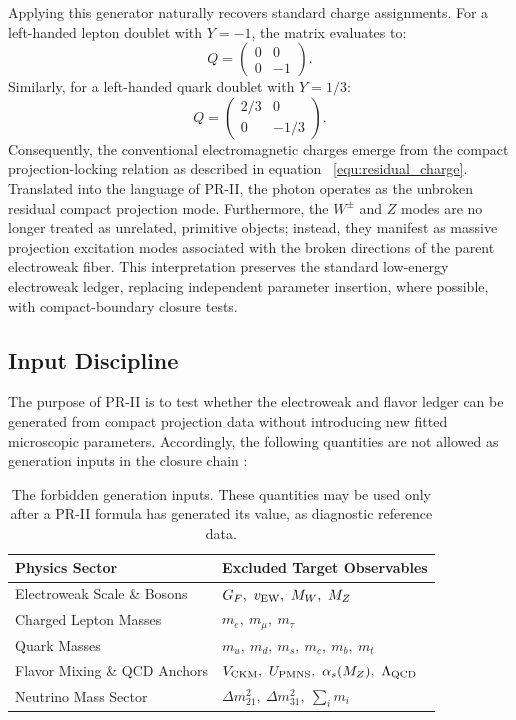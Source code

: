 \documentclass[11pt]{article}
\renewcommand{\arraystretch}{1.22}
\renewcommand{\arraystretch}{1.4}
\begin{document}
Applying this generator naturally recovers standard charge assignments. For a left-handed lepton doublet with \(Y=-1\), the matrix evaluates to:
\begin{equation}
Q
=
\begin{pmatrix}
0 & 0\\
0 & -1
\end{pmatrix}.
\end{equation}
Similarly, for a left-handed quark doublet with \(Y=1/3\):
\begin{equation}
Q
=
\begin{pmatrix}
2/3 & 0\\
0 & -1/3
\end{pmatrix}.
\end{equation}
Consequently, the conventional electromagnetic charges emerge from the compact projection-locking relation as described in equation ~\ref{equ:residual_charge}. Translated into the language of PR-II, the photon operates as the unbroken residual compact projection mode. Furthermore, the \(W^\pm\) and \(Z\) modes are no longer treated as unrelated, primitive objects; instead, they manifest as massive projection excitation modes associated with the broken directions of the parent electroweak fiber. This interpretation preserves the standard low-energy electroweak ledger, replacing independent parameter insertion, where possible, with compact-boundary closure tests.

\subsection{Input Discipline}
\label{sec:pr2_boundary_input_discipline}

The purpose of PR-II is to test whether the electroweak and flavor ledger can be generated from compact projection data without introducing new fitted microscopic parameters. Accordingly, the following quantities are not allowed as generation inputs in the closure chain \cite{TiesingaCODATA2021, PDG2024}:

\begin{table}[htbp]
\centering
\caption{The forbidden generation inputs. These quantities may be used only after a PR-II formula has generated its value, as diagnostic reference data.}
\renewcommand{\arraystretch}{1.4}
\begin{tabular}{ll}
\hline\hline
\textbf{Physics Sector} & \textbf{Excluded Target Observables} \\
\hline
Electroweak Scale \& Bosons & $G_F,\ v_{\rm EW},\ M_W,\ M_Z$ \\
Charged Lepton Masses & $m_e,\ m_\mu,\ m_\tau$ \\
Quark Masses & $m_u,\ m_d,\ m_s,\ m_c,\ m_b,\ m_t$ \\
Flavor Mixing \& QCD Anchors & $V_{\rm CKM},\ U_{\rm PMNS},\ \alpha_s(M_Z),\ \Lambda_{\rm QCD}$ \\
Neutrino Mass Sector & $\Delta m_{21}^2,\ \Delta m_{31}^2,\ \sum_i m_i$ \\
\hline\hline
\end{tabular}
\label{tab:forbidden_inputs}
\end{table}
\end{document}
